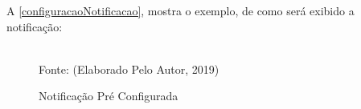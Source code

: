 \newpage
A \autoref{configuracaoNotificacao}, mostra  o exemplo, de como será exibido a notificação:

\begin{figure}[!htpb]
	\centering
	\caption{Notificação Pré Configurada}
	\\
	Fonte: (Elaborado Pelo Autor, 2019)
	\label{configuracaoNotificacao}
\end{figure}

